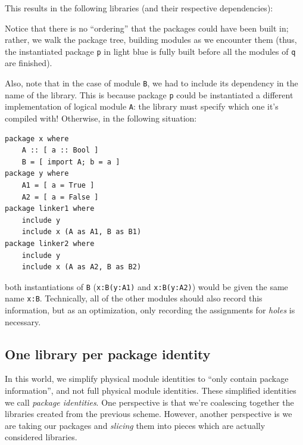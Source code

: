 \documentclass{article}
\begin{document}
This results in the following
libraries (and their respective dependencies): \\


Notice that there is no ``ordering'' that the packages could have been
built in; rather, we walk the package tree, building modules as we encounter
them (thus, the instantiated package \verb|p| in light blue is fully built before all
the modules of \verb|q| are finished).

Also, note that in the case of module \verb|B|, we had to include its
dependency in the name of the library.  This is because package \verb|p| could
be instantiated a different implementation of logical module \verb|A|: the
library must specify which one it's compiled with!  Otherwise, in the following situation:

\begin{verbatim}
package x where
    A :: [ a :: Bool ]
    B = [ import A; b = a ]
package y where
    A1 = [ a = True ]
    A2 = [ a = False ]
package linker1 where
    include y
    include x (A as A1, B as B1)
package linker2 where
    include y
    include x (A as A2, B as B2)
\end{verbatim}

both instantiations of \verb|B| (\verb|x:B(y:A1)| and \verb|x:B(y:A2)|)
would be given the same name \verb|x:B|.
Technically, all of the other
modules should also record this information, but as an optimization, only
recording the assignments for \emph{holes} is necessary.

\subsection{One library per package identity}\label{sec:one-per-package-identity}

In this world, we simplify physical module identities to ``only contain
package information'', and not full physical module identities.  These
simplified identities we call \emph{package identities}. One perspective
is that we're coalescing together the libraries created from the
previous scheme.  However, another perspective is we are taking our
packages and \emph{slicing} them into pieces which are actually
considered libraries.
\end{document}
